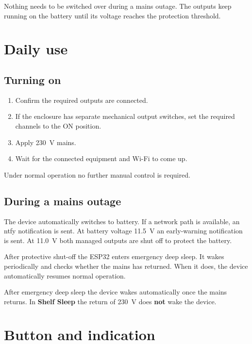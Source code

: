 \documentclass[10.5pt,a5paper]{article}
\begin{document}
\begin{infobox}[title=Normal operation]
Nothing needs to be switched over during a mains outage. The outputs keep running on the battery until its voltage reaches the protection threshold.
\end{infobox}

\section{Daily use}

\subsection{Turning on}
\begin{enumerate}
  \item Confirm the required outputs are connected.
  \item If the enclosure has separate mechanical output switches, set the required channels to the ON position.
  \item Apply 230~V mains.
  \item Wait for the connected equipment and Wi-Fi to come up.
\end{enumerate}

Under normal operation no further manual control is required.

\subsection{During a mains outage}
The device automatically switches to battery. If a network path is available, an ntfy notification is sent. At battery voltage 11.5~V an early-warning notification is sent. At 11.0~V both managed outputs are shut off to protect the battery.

After protective shut-off the ESP32 enters emergency deep sleep. It wakes periodically and checks whether the mains has returned. When it does, the device automatically resumes normal operation.

\begin{warnbox}[title=Do not confuse with Shelf Sleep]
After emergency deep sleep the device wakes automatically once the mains returns. In \textbf{Shelf Sleep} the return of 230~V does \textbf{not} wake the device.
\end{warnbox}

\section{Button and indication}
\end{document}
